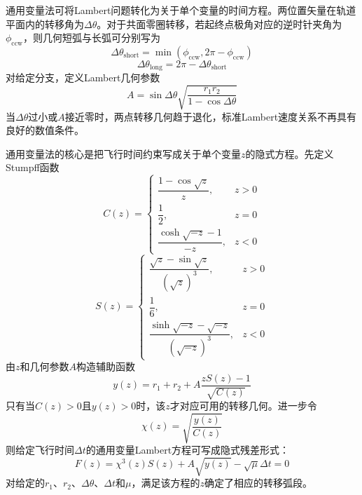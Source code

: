 \documentclass[10.5pt,twocolumn]{aaas}
\begin{document}
通用变量法可将Lambert问题转化为关于单个变量的时间方程。两位置矢量在轨道平面内的转移角为$\Delta\theta$。对于共面零圈转移，若起终点极角对应的逆时针夹角为$\phi_{\mathrm{ccw}}$，则几何短弧与长弧可分别写为
\begin{equation}
  \Delta\theta_{\mathrm{short}}
  =
  \min\left(\phi_{\mathrm{ccw}},2\pi-\phi_{\mathrm{ccw}}\right)
\end{equation}
\begin{equation}
  \Delta\theta_{\mathrm{long}}
  =
  2\pi-\Delta\theta_{\mathrm{short}}
\end{equation}
对给定分支，定义Lambert几何参数
\begin{equation}
  A=\sin\Delta\theta
  \sqrt{\frac{r_1r_2}{1-\cos\Delta\theta}}
\end{equation}
当$\Delta\theta$过小或$A$接近零时，两点转移几何趋于退化，标准Lambert速度关系不再具有良好的数值条件。

通用变量法的核心是把飞行时间约束写成关于单个变量$z$的隐式方程。先定义Stumpff函数
\begin{equation}
  C(z)=
  \begin{cases}
    \dfrac{1-\cos\sqrt{z}}{z},    & z>0 \\[1.0ex]
    \dfrac{1}{2},                 & z=0 \\[1.0ex]
    \dfrac{\cosh\sqrt{-z}-1}{-z}, & z<0
  \end{cases}
\end{equation}
\begin{equation}
  S(z)=
  \begin{cases}
    \dfrac{\sqrt{z}-\sin\sqrt{z}}{\left(\sqrt{z}\right)^3},     & z>0 \\[1.0ex]
    \dfrac{1}{6},                                               & z=0 \\[1.0ex]
    \dfrac{\sinh\sqrt{-z}-\sqrt{-z}}{\left(\sqrt{-z}\right)^3}, & z<0
  \end{cases}
\end{equation}
由$z$和几何参数$A$构造辅助函数
\begin{equation}
  y(z)=r_1+r_2+
  A\frac{zS(z)-1}{\sqrt{C(z)}}
\end{equation}
只有当$C(z)>0$且$y(z)>0$时，该$z$才对应可用的转移几何。进一步令
\begin{equation}
  \chi(z)=\sqrt{\frac{y(z)}{C(z)}}
\end{equation}
则给定飞行时间$\Delta t$的通用变量Lambert方程可写成隐式残差形式：
\begin{equation}
  F(z)=\chi^3(z)S(z)+A\sqrt{y(z)}
  -\sqrt{\mu}\Delta t=0
\end{equation}
对给定的$r_1$、$r_2$、$\Delta\theta$、$\Delta t$和$\mu$，满足该方程的$z$确定了相应的转移弧段。
\end{document}
